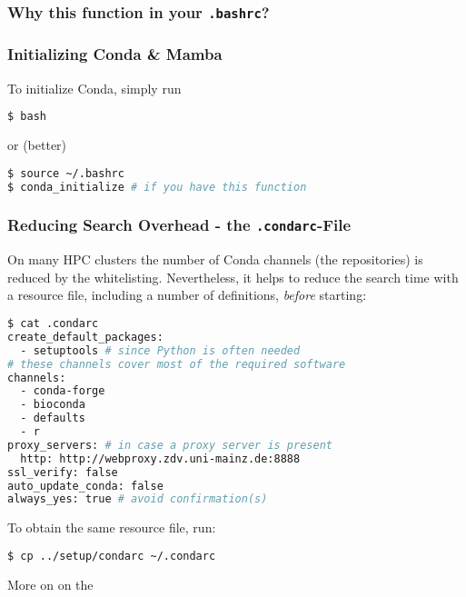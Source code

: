\begin{frame}[fragile]
  \frametitle{Why this function in your \texttt{.bashrc}?}
\end{frame}

\begin{frame}[fragile]
  \frametitle{Initializing Conda \& Mamba}
  To initialize Conda, simply run
  \begin{lstlisting}[language=Bash, style=Shell]
$ bash
  \end{lstlisting}
  or (better)
  \begin{lstlisting}[language=Bash, style=Shell]
$ source ~/.bashrc
$ conda_initialize # if you have this function
  \end{lstlisting}
\end{frame}


\begin{frame}[fragile]
  \frametitle{Reducing Search Overhead - the \texttt{.condarc}-File}
  On many HPC clusters the number of Conda channels (the repositories) is reduced by the whitelisting. Nevertheless, it helps to reduce the search time with a resource file, including  a number of definitions, \emph{before} starting:
  \begin{lstlisting}[language=Bash, style=Shell, basicstyle=\tiny]
$ cat .condarc
create_default_packages:
  - setuptools # since Python is often needed
# these channels cover most of the required software
channels:
  - conda-forge
  - bioconda
  - defaults
  - r
proxy_servers: # in case a proxy server is present
  http: http://webproxy.zdv.uni-mainz.de:8888
ssl_verify: false
auto_update_conda: false
always_yes: true # avoid confirmation(s)
  \end{lstlisting}
  To obtain the same resource file, run:
  \begin{lstlisting}[language=Bash, style=Shell, basicstyle=\footnotesize]
$ cp ../setup/condarc ~/.condarc
  \end{lstlisting}
  More on  on the 
\end{frame}

